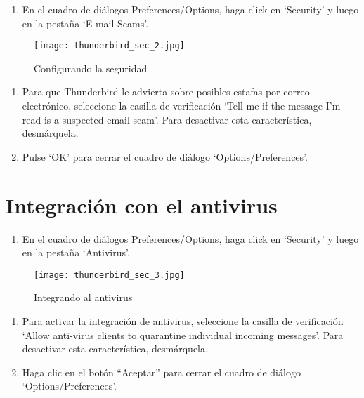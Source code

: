 \documentclass[10pt,a5paper,twoside,,]{book}
\providecommand{\tightlist}{%
  \setlength{\itemsep}{0pt}\setlength{\parskip}{0pt}}
\begin{document}
\begin{enumerate}
\def\labelenumi{\arabic{enumi}.}
\tightlist
\item
  En el cuadro de diálogos Preferences/Options, haga click en `Security'
  y luego en la pestaña `E-mail Scams'.
\end{enumerate}

\begin{figure}[htbp]
\centering
\texttt{[image: thunderbird\_sec\_2.jpg]}
\caption{Configurando la seguridad}
\end{figure}

\begin{enumerate}
\def\labelenumi{\arabic{enumi}.}
\setcounter{enumi}{1}
\item
  Para que Thunderbird le advierta sobre posibles estafas por correo
  electrónico, seleccione la casilla de verificación `Tell me if the
  message I'm read is a suspected email scam'. Para desactivar esta
  característica, desmárquela.
\item
  Pulse `OK' para cerrar el cuadro de diálogo `Options/Preferences'.
\end{enumerate}

\section{Integración con el
antivirus}\label{integraciuxf3n-con-el-antivirus}

\begin{enumerate}
\def\labelenumi{\arabic{enumi}.}
\tightlist
\item
  En el cuadro de diálogos Preferences/Options, haga click en `Security'
  y luego en la pestaña `Antivirus'.
\end{enumerate}

\begin{figure}[htbp]
\centering
\texttt{[image: thunderbird\_sec\_3.jpg]}
\caption{Integrando al antivirus}
\end{figure}

\begin{enumerate}
\def\labelenumi{\arabic{enumi}.}
\setcounter{enumi}{1}
\tightlist
\item
  Para activar la integración de antivirus, seleccione la casilla de
  verificación `Allow anti-virus clients to quarantine individual
  incoming messages'. Para desactivar esta característica, desmárquela.
\item
  Haga clic en el botón ``Aceptar'' para cerrar el cuadro de diálogo
  `Options/Preferences'.
\end{enumerate}
\end{document}
